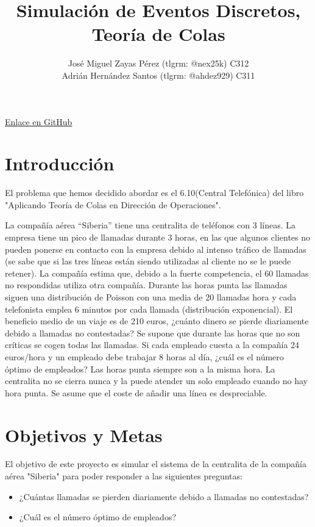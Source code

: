 \documentclass{article}
\title{Simulación de Eventos Discretos, Teoría de Colas}
\author{José Miguel Zayas Pérez (tlgrm: @nex25k) C312 \\ Adrián Hernández Santos (tlgrm: @ahdez929) C311}
\begin{document}
\maketitle{}
\begin{center}
    \href{https://github.com/josem-nex/queue-simulation}{Enlace en GitHub}
\end{center}
\section{Introducción}


El problema que hemos decidido abordar es el 6.10(Central Telefónica) del libro "Aplicando Teoría de Colas en
Dirección de Operaciones".

La compañía aérea “Siberia” tiene una centralita de teléfonos con 3 líneas. La
empresa tiene un pico de llamadas durante 3 horas, en las que algunos clientes no
pueden ponerse en contacto con la empresa debido al intenso tráfico de llamadas
(se sabe que si las tres líneas están siendo utilizadas al cliente no se le puede
retener). La compañía estima que, debido a la fuerte competencia, el 60%
llamadas no respondidas utiliza otra compañía. Durante las horas punta las
llamadas siguen una distribución de Poisson con una media de 20 llamadas hora y
cada telefonista emplea 6 minutos por cada llamada (distribución exponencial). El
beneficio medio de un viaje es de 210 euros, ¿cuánto dinero se pierde diariamente
debido a llamadas no contestadas? Se supone que durante las horas que no son
críticas se cogen todas las llamadas. Si cada empleado cuesta a la compañía 24
euros/hora y un empleado debe trabajar 8 horas al día, ¿cuál es el número óptimo
de empleados? Las horas punta siempre son a la misma hora. La centralita no se
cierra nunca y la puede atender un solo empleado cuando no hay hora punta. Se
asume que el coste de añadir una línea es despreciable.



\section{Objetivos y Metas}
El objetivo de este proyecto es simular el sistema de la centralita de la compañía aérea "Siberia" para poder responder a las siguientes preguntas:
\begin{itemize}
    \item ¿Cuántas llamadas se pierden diariamente debido a llamadas no contestadas?
    \item ¿Cuál es el número óptimo de empleados?
\end{itemize}
\end{document}
